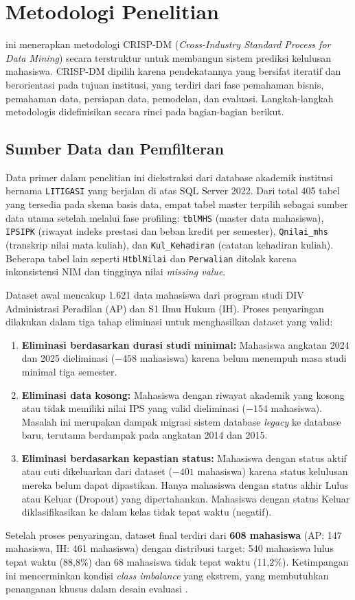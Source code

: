 \documentclass{ieeeaccess}
\begin{document}
\section{Metodologi Penelitian}
\label{sec:methodology}

 ini menerapkan metodologi CRISP-DM (\emph{Cross-Industry Standard Process for Data Mining}) secara terstruktur untuk membangun sistem prediksi kelulusan mahasiswa. CRISP-DM dipilih karena pendekatannya yang bersifat iteratif dan berorientasi pada tujuan institusi, yang terdiri dari fase pemahaman bisnis, pemahaman data, persiapan data, pemodelan, dan evaluasi. Langkah-langkah metodologis didefinisikan secara rinci pada bagian-bagian berikut.

\subsection{Sumber Data dan Pemfilteran}
Data primer dalam penelitian ini diekstraksi dari database akademik institusi bernama \texttt{LITIGASI} yang berjalan di atas SQL Server 2022. Dari total 405 tabel yang tersedia pada skema basis data, empat tabel master terpilih sebagai sumber data utama setelah melalui fase profiling: \texttt{tblMHS} (master data mahasiswa), \texttt{IPSIPK} (riwayat indeks prestasi dan beban kredit per semester), \texttt{Qnilai\_mhs} (transkrip nilai mata kuliah), dan \texttt{Kul\_Kehadiran} (catatan kehadiran kuliah). Beberapa tabel lain seperti \texttt{HtblNilai} dan \texttt{Perwalian} ditolak karena inkonsistensi NIM dan tingginya nilai \emph{missing value}.

Dataset awal mencakup 1.621 data mahasiswa dari program studi DIV Administrasi Peradilan (AP) dan S1 Ilmu Hukum (IH). Proses penyaringan dilakukan dalam tiga tahap eliminasi untuk menghasilkan dataset yang valid:
\begin{enumerate}
    \item \textbf{Eliminasi berdasarkan durasi studi minimal:} Mahasiswa angkatan 2024 dan 2025 dieliminasi ($-458$ mahasiswa) karena belum menempuh masa studi minimal tiga semester.
    \item \textbf{Eliminasi data kosong:} Mahasiswa dengan riwayat akademik yang kosong atau tidak memiliki nilai IPS yang valid dieliminasi ($-154$ mahasiswa). Masalah ini merupakan dampak migrasi sistem database \emph{legacy} ke database baru, terutama berdampak pada angkatan 2014 dan 2015.
    \item \textbf{Eliminasi berdasarkan kepastian status:} Mahasiswa dengan status aktif atau cuti dikeluarkan dari dataset ($-401$ mahasiswa) karena status kelulusan mereka belum dapat dipastikan. Hanya mahasiswa dengan status akhir Lulus atau Keluar (Dropout) yang dipertahankan. Mahasiswa dengan status Keluar diklasifikasikan ke dalam kelas tidak tepat waktu (negatif).
\end{enumerate}
Setelah proses penyaringan, dataset final terdiri dari \textbf{608 mahasiswa} (AP: 147 mahasiswa, IH: 461 mahasiswa) dengan distribusi target: 540 mahasiswa lulus tepat waktu (88,8\%) dan 68 mahasiswa tidak tepat waktu (11,2\%). Ketimpangan ini mencerminkan kondisi \emph{class imbalance} yang ekstrem, yang membutuhkan penanganan khusus dalam desain evaluasi \cite{ref27}.
\end{document}
